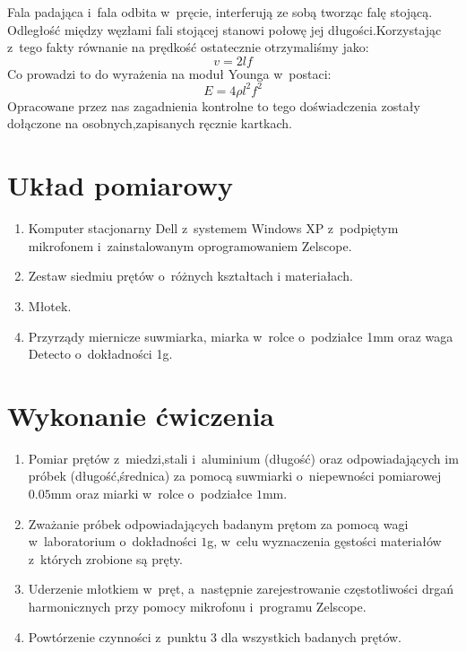 \documentclass{fizraport}
\begin{document}
Fala padająca i~fala odbita w~pręcie, interferują ze sobą tworząc falę stojącą.
Odległość między węzłami fali stojącej stanowi połowę jej długości.Korzystając z~tego fakty równanie na prędkość ostatecznie
otrzymaliśmy jako:
\begin{equation*}
    v = 2 lf
\end{equation*}
%
Co prowadzi to do wyrażenia na moduł Younga w~postaci:
\begin{equation}
    E = 4\rho l^2 f^2
    \label{eq:S4YoungMod}
\end{equation}
%
Opracowane przez nas zagadnienia kontrolne to tego doświadczenia zostały dołączone na osobnych,zapisanych ręcznie kartkach.
\newpage %
\addtocounter{page}{2}%

\section{Układ pomiarowy}
\begin{enumerate}
		\item Komputer stacjonarny Dell z~systemem Windows XP z~podpiętym mikrofonem i~zainstalowanym oprogramowaniem Zelscope.
		\item Zestaw siedmiu prętów o~różnych kształtach i materiałach.
		\item Młotek.
		\item Przyrządy miernicze suwmiarka, miarka w~rolce o~podziałce 1mm oraz waga Detecto o~dokładności 1g.
\end{enumerate}
	
\section{Wykonanie ćwiczenia}
\begin{enumerate}
    \item Pomiar prętów z~miedzi,stali i~aluminium (długość) oraz odpowiadających im próbek (długość,średnica) za pomocą suwmiarki o~niepewności pomiarowej $0.05$mm oraz miarki w~rolce o~podziałce $1$mm.
    \item Zważanie próbek odpowiadających badanym prętom za pomocą wagi w~laboratorium o~dokładności $1$g, w~celu wyznaczenia gęstości materiałów z~których zrobione są pręty.
    \item Uderzenie młotkiem w~pręt, a~następnie zarejestrowanie częstotliwości drgań harmonicznych przy pomocy mikrofonu i~programu Zelscope.
    \item Powtórzenie czynności z~punktu 3 dla wszystkich badanych prętów.
\end{enumerate}
\end{document}
